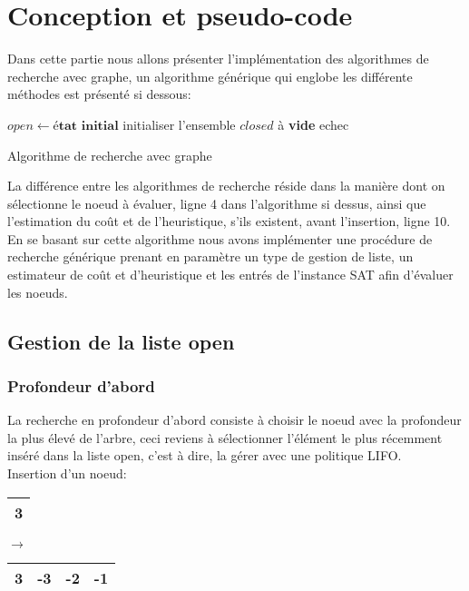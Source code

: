 \section{Conception et pseudo-code}
Dans cette partie nous allons présenter l’implémentation des algorithmes de recherche avec graphe, un algorithme générique qui englobe les différente méthodes est présenté si dessous:

\begin{algorithm}
	\SetAlgoLined
	$open \gets \textbf{état initial}$\;
	initialiser l'ensemble $closed$ à \textbf{vide}\;
	\Return echec\;
\caption{Algorithme de recherche avec graphe}
\end{algorithm}
La différence entre les algorithmes de recherche réside dans la manière dont on sélectionne le noeud à évaluer, ligne 4 dans l’algorithme si dessus, ainsi que l’estimation du coût et de l’heuristique, s’ils existent, avant l’insertion, ligne 10.\\
En se basant sur cette algorithme nous avons implémenter une procédure de recherche générique prenant en paramètre un type de gestion de liste, un estimateur de coût et d’heuristique et les entrés de l’instance SAT afin d’évaluer les noeuds.
\subsection{Gestion de la liste open}

\subsubsection{Profondeur d'abord}
La recherche en profondeur d’abord consiste à choisir le noeud avec la profondeur la plus élevé de l’arbre, ceci reviens à sélectionner l’élément le plus récemment inséré dans la liste open, c’est à dire, la gérer avec une politique LIFO.\\
Insertion d'un noeud:\\
\begin{minipage}{0.5\textwidth}
	\centering
	\begin{tabular}{|c |}
		\hline
		 3 \\
		\hline
	\end{tabular}
\end{minipage}
\hfillx
$\rightarrow$
\begin{minipage}{0.5\textwidth}
	\centering
	\begin{tabular}{|c | c| c| c|}
		\hline
		{\color{red}3} & -3 & -2 & -1 \\\hline
	\end{tabular}
\end{minipage}

